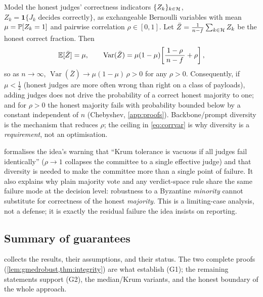 \begin{proposition}
\label{prop:correlated}
Model the honest judges' correctness indicators $\{Z_k\}_{k\in\mathcal{H}}$, $Z_k=\mathbf 1\{J_k
\text{ decides correctly}\}$, as exchangeable Bernoulli variables with mean
$\mu=\mathbb{P}[Z_k=1]$ and pairwise correlation $\rho\in[0,1]$. Let $\bar Z=\frac1{n-f}
\sum_{k\in\mathcal{H}}Z_k$ be the honest correct fraction. Then
\begin{equation}
  \mathbb{E}[\bar Z]=\mu,\qquad
  \operatorname{Var}(\bar Z)=\mu(1-\mu)\!\left[\frac{1-\rho}{\,n-f\,}+\rho\right],
  \label{eq:corrvar}
\end{equation}
so as $n\to\infty$, $\operatorname{Var}(\bar Z)\to \mu(1-\mu)\,\rho>0$ for any $\rho>0$.
Consequently, if $\mu<\tfrac12$ (honest judges are more often wrong than right on a class
of payloads), adding judges does not drive the probability of a correct honest majority to
one; and for $\rho>0$ the honest majority fails with probability bounded below by a
constant independent of $n$ (Chebyshev, \cref{app:proofs}). Backbone/prompt diversity is
the mechanism that reduces $\rho$; the ceiling in \cref{eq:corrvar} is why diversity is a
\emph{requirement}, not an optimisation.
\end{proposition}
\begin{remark}
 formalises the idea's warning that ``Krum tolerance is vacuous if
all judges fail identically'' ($\rho\to1$ collapses the committee to a single effective
judge) and that diversity is needed to make the committee more than a single point of
failure. It also explains why plain majority vote and any verdict-space rule share the same
failure mode at the decision level: robustness to a Byzantine \emph{minority} cannot
substitute for correctness of the honest \emph{majority}. This is a limiting-case analysis,
not a defense; it is exactly the residual failure the idea insists on reporting.
\end{remark}

\subsection{Summary of guarantees}
 collects the results, their assumptions, and their status. The two
complete proofs (\cref{lem:gmedrobust,thm:integrity}) are what establish (G1); the
remaining statements support (G2), the median/Krum variants, and the honest boundary of
the whole approach.

